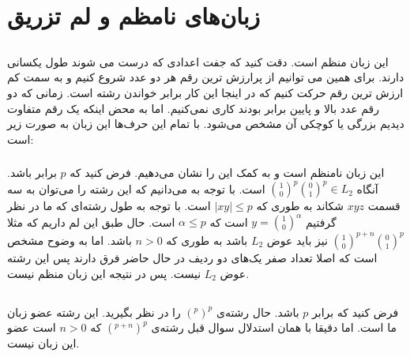 \section{زبان‌های نامظم و لم تزریق}
\subsection{}
\subsubsection{}
این زبان منظم است. دقت کنید که جفت اعدادی که درست می شوند طول یکسانی دارند. برای همین می توانیم از
پرارزش ترین رقم هر دو عدد شروع کنیم و به سمت کم ارزش ترین رقم حرکت کنیم که در اینجا این کار
برابر خواندن رشته است. زمانی که دو رقم عدد بالا و پایین برابر بودند کاری نمی‌کنیم. اما به محض اینکه یک
رقم متفاوت دیدیم بزرگی یا کوچکی آن مشخص می‌شود. با تمام این حرف‌ها
این زبان به صورت زیر است:
\begin{latin}
    \centering
\end{latin}
\subsubsection{}
این زبان نامنظم است و به کمک
این را نشان می‌دهیم. فرض کنید که
$p$
برابر
باشد. آنگاه
$\binom{1}{0}^p \binom{0}{1}^p \in L_2$
است. با توجه به
می‌دانیم که این رشته را می‌توان به سه قسمت
$xyz$
شکاند به طوری که
$|xy| \le p$
است. با توجه به طول رشته‌ای که ما در نظر گرفتیم
$y = \binom{1}{0}^\alpha$
است که
$\alpha \le p$
است. حال طبق این لم داریم که مثلا
$\binom{1}{0}^{p + n} \binom{0}{1}^p$
نیز باید عوض
$L_2$
باشد به طوری که
$n > 0$
باشد. اما به وضوح مشخص است که اصلا تعداد صفر یک‌های دو ردیف در حال حاضر فرق دارند پس این رشته عوض
$L_2$
نیست. پس در نتیجه این زبان منظم نیست.
\subsection{}
فرض کنید که
برابر
$p$
باشد. حال رشته‌ی
$(^p)^p$
را در نظر بگیرید. این رشته عضو زبان ما است. اما دقیقا با همان استدلال سوال قبل رشته‌ی
$(^{p+n})^p$
که
$n > 0$
است عضو این زبان نیست.
